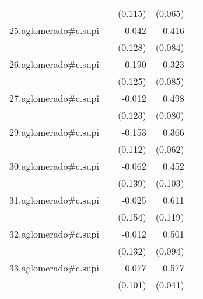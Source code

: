 {\begin{longtable}{l*{4}{D{.}{.}{-1}}}
            &                     &     (0.115)         &     (0.065)         &                     \\
\addlinespace
25.aglomerado#c.supi&                     &      -0.042         &       0.416\sym{***}&                     \\
            &                     &     (0.128)         &     (0.084)         &                     \\
\addlinespace
26.aglomerado#c.supi&                     &      -0.190         &       0.323\sym{***}&                     \\
            &                     &     (0.125)         &     (0.085)         &                     \\
\addlinespace
27.aglomerado#c.supi&                     &      -0.012         &       0.498\sym{***}&                     \\
            &                     &     (0.123)         &     (0.080)         &                     \\
\addlinespace
29.aglomerado#c.supi&                     &      -0.153         &       0.366\sym{***}&                     \\
            &                     &     (0.112)         &     (0.062)         &                     \\
\addlinespace
30.aglomerado#c.supi&                     &      -0.062         &       0.452\sym{***}&                     \\
            &                     &     (0.139)         &     (0.103)         &                     \\
\addlinespace
31.aglomerado#c.supi&                     &      -0.025         &       0.611\sym{***}&                     \\
            &                     &     (0.154)         &     (0.119)         &                     \\
\addlinespace
32.aglomerado#c.supi&                     &      -0.012         &       0.501\sym{***}&                     \\
            &                     &     (0.132)         &     (0.094)         &                     \\
\addlinespace
33.aglomerado#c.supi&                     &       0.077         &       0.577\sym{***}&                     \\
            &                     &     (0.101)         &     (0.041)         &                     \\

\end{longtable}}
